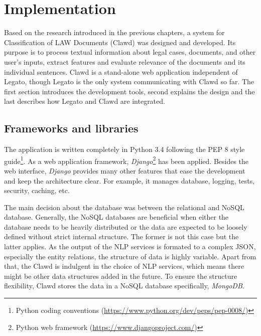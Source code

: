 \documentclass[
  digital, %
  notable,   %
  nolof,     %
  nolot,     %
]{fithesis3}
\begin{document}
\chapter{Implementation}
\label{chp:implementation}
Based on the research introduced in the previous chapters, a system for Classification of LAW Documents (Clawd) was designed and developed.
Its purpose is to process textual information about legal cases, documents, and other user's inputs, extract features and evaluate relevance of the documents and its individual sentences.
Clawd is a stand-alone web application independent of Legato, though Legato is the only system communicating with Clawd so far.
The first section introduces the development tools, second explains the design and the last describes how Legato and Clawd are integrated.

\section{Frameworks and libraries}
The application is written completely in Python 3.4 following the PEP 8 style guide\footnote{Python coding conventions (\url{https://www.python.org/dev/peps/pep-0008/})}.
As a web application framework, \textit{Django}\footnote{Python web framework (\url{https://www.djangoproject.com/})} has been applied.
Besides the web interface, \textit{Django} provides many other features that ease the development and keep the architecture clear.
For example, it manages database, logging, tests, security, caching, etc.

The main decision about the database was between the relational and NoSQL database.
Generally, the NoSQL databases are beneficial when either the database needs to be heavily distributed or the data are expected to be loosely defined without strict internal structure.
The former is not this case but the latter applies.
As the output of the NLP services is formated to a complex JSON, especially the entity relations, the structure of data is highly variable.
Apart from that, the Clawd is indulgent in the choice of NLP services, which means there might be other data structures added in the future.
To ensure the structure flexibility, Clawd stores the data in a NoSQL database specifically, \textit{MongoDB}.
\end{document}
